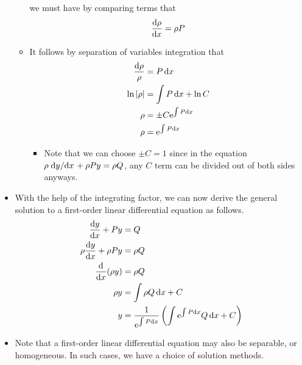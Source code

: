 \documentclass[../main.tex]{subfiles}
\begin{document}
\begin{itemize}
\begin{itemize}
        we must have by comparing terms that
        \begin{equation*}
            \dv{\rho}{x} = \rho P
        \end{equation*}
        \item It follows by separation of variables integration that
        \begin{align*}
            \frac{\dd{\rho}}{\rho} &= P\dd{x}\\
            \ln|\rho| &= \int P\dd{x}+\ln C\\
            \rho &= \pm C\e[\int P\dd{x}]\\
            \rho &= \e[\int P\dd{x}]
        \end{align*}
        \begin{itemize}
            \item Note that we can choose $\pm C=1$ since in the equation $\rho\dv*{y}{x}+\rho Py=\rho Q$, any $C$ term can be divided out of both sides anyways.
        \end{itemize}
    \end{itemize}
    \item With the help of the integrating factor, we can now derive the general solution to a first-order linear differential equation as follows.
    \begin{align*}
        \dv{y}{x}+Py &= Q\\
        \rho\dv{y}{x}+\rho Py &= \rho Q\\
        \dv{x}(\rho y) &= \rho Q\\
        \rho y &= \int\rho Q\dd{x}+C\\
        y &= \frac{1}{\e[\int P\dd{x}]}\left( \int\e[\int P\dd{x}]Q\dd{x}+C \right)
    \end{align*}
    \item Note that a first-order linear differential equation may also be separable, or homogeneous. In such cases, we have a choice of solution methods.
\end{itemize}
\end{document}
